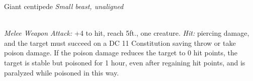 \documentclass[10pt,twoside,twocolumn,openany]{book}
\begin{document}
\begin{monsterboxnobg}{Giant centipede}
	\textit{Small beast, unaligned}\\
	\hline
	\basics[
		armorclass	= 13 (natural armor),
		hitpoints 		= \dice{1d6 + 1},
		speed		= {30 ft., climb 30 ft.}
	]
	\hline
	\stats[
		STR	= \stat{5},
		DEX	= \stat{14},
		CON	= \stat{12},
		INT	= \stat{1},
		WIS	= \stat{7},
		CHA	= \stat{3}
	]
	\hline
	\details[
		skills			= {},
		senses		= {blindsight 30 ft., passive Perception 8},
		languages		= {-},
		challenge		= 1/4
	]
	\hline \\[1mm]
	\begin{monsteraction}[Bite]
		\textit{Melee Weapon Attack:} +4 to hit, reach 5ft., one creature. \textit{Hit:}  piercing damage, and the target must succeed on a DC 11 Constitution saving throw or take  poison damage. If the poison damage reduces the target to 0 hit points, the target is stable but poisoned for 1 hour, even after regaining hit points, and is paralyzed while poisoned in this way.
	\end{monsteraction}
\end{monsterboxnobg}
\end{document}
